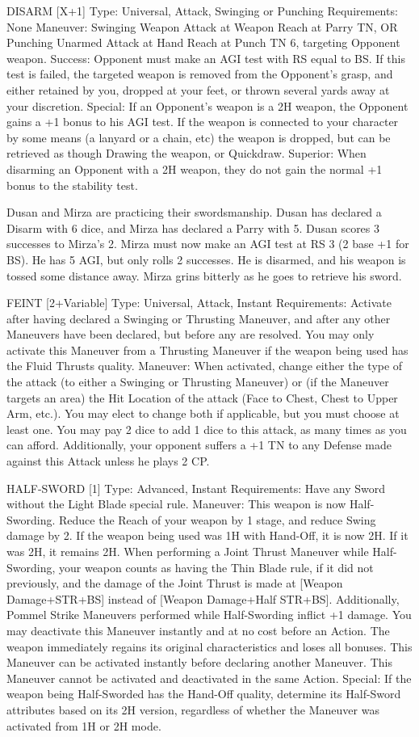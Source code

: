 \documentclass[oneside,11pt,english]{book}
\begin{document}
DISARM [X+1]
Type: Universal, Attack, Swinging or Punching 
Requirements: None 
Maneuver: Swinging Weapon Attack at Weapon Reach at Parry TN, OR Punching Unarmed Attack at Hand Reach at Punch TN 6, targeting Opponent weapon. 
Success: Opponent must make an AGI test with RS equal to BS. If this test is failed, the targeted weapon is removed from the Opponent's grasp, and either retained by you, dropped at your feet, or thrown several yards away at your discretion.
Special: If an Opponent’s weapon is a 2H weapon, the Opponent gains a +1 bonus to his AGI test.  If the weapon is connected to your character by some means (a lanyard or a chain, etc) the weapon is dropped, but can be retrieved as though Drawing the weapon, or Quickdraw. 
Superior: When disarming an Opponent with a 2H weapon, they do not gain the normal +1 bonus to the 
stability test. 


Dusan and Mirza are practicing their swordsmanship. Dusan has declared a Disarm with 6 dice, and Mirza has declared a 
Parry with 5. Dusan scores 3 successes to Mirza’s 2. Mirza must now make an AGI test at RS 3 (2 base +1 for BS). He has 5 AGI, but only rolls 2 successes. He is disarmed, and his weapon is tossed some distance away. Mirza grins bitterly as he goes to retrieve his sword.


FEINT [2+Variable] 
Type: Universal, Attack, Instant 
Requirements: Activate after having declared a Swinging or Thrusting Maneuver, and after any other Maneuvers have been declared, but before any are resolved. You may only activate this Maneuver from a Thrusting Maneuver if the weapon being used has the Fluid Thrusts quality. 
Maneuver: When activated, change either the type of the attack (to either a Swinging or Thrusting Maneuver) or (if the Maneuver targets an area) the Hit Location of the attack (Face to Chest, Chest to Upper Arm, etc.). You may elect to change both if applicable, but you must choose at least one. You may pay 2 dice to add 1 dice to this attack, as many times as you can afford. Additionally, your opponent suffers a +1 TN to any Defense made against this Attack unless he plays 2 CP.


HALF-SWORD [1] 
Type: Advanced, Instant 
Requirements: Have any Sword without the Light Blade special rule. 
Maneuver: This weapon is now Half-Swording. Reduce the Reach of your weapon by 1 stage, and reduce Swing damage by 2. If the weapon being used was 1H with Hand-Off, it is now 2H. If it was 2H, it remains 2H. When performing a Joint Thrust Maneuver while Half-Swording, your weapon counts as having the Thin Blade rule, if it did not previously, and the damage of the Joint Thrust is made at [Weapon Damage+STR+BS] instead of [Weapon Damage+Half STR+BS]. Additionally, Pommel Strike Maneuvers performed while Half-Swording inflict +1 damage. You may deactivate this Maneuver instantly and at no cost before an Action. The weapon immediately regains its original characteristics and loses all bonuses. This Maneuver can be activated instantly before declaring another Maneuver. This Maneuver cannot be activated and deactivated in the same Action.
Special: If the weapon being Half-Sworded has the Hand-Off quality, determine its Half-Sword attributes 
based on its 2H version, regardless of whether the Maneuver was activated from 1H or 2H mode. 
\end{document}
